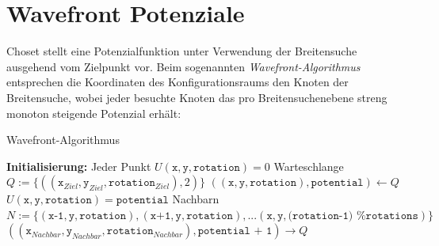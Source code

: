 \vspace*{0.2cm}
\section{Wavefront Potenziale}

Choset stellt eine Potenzialfunktion unter Verwendung der Breitensuche ausgehend vom Zielpunkt vor. Beim sogenannten \textit{Wavefront-Algorithmus} entsprechen die Koordinaten des Konfigurationsraums den Knoten der Breitensuche, wobei jeder besuchte Knoten das pro Breitensuchenebene streng monoton steigende Potenzial erhält: \cite{choset.2007}
\vspace*{0.1cm}
\begin{algorithm}
\caption{Wavefront-Algorithmus}
	\begin{algorithmic}[1]
  \State \textbf{Initialisierung:}
  \State \hspace{\algorithmicindent} Jeder Punkt $U(\texttt{x}, \texttt{y}, \texttt{rotation}) = 0$
  \State \hspace{\algorithmicindent} Warteschlange $Q := \{((\texttt{x}_{Ziel}, \texttt{y}_{Ziel}, \texttt{rotation}_{Ziel}), 2)\}$
		\vspace*{0.3cm}
      \State $((\texttt{x}, \texttt{y}, \texttt{rotation}), \texttt{potential}) \gets Q$
      \State $U(\texttt{x}, \texttt{y}, \texttt{rotation}) = \texttt{potential}$
      \State Nachbarn $N := \{(\texttt{x-1}, \texttt{y}, \texttt{rotation}), (\texttt{x+1}, \texttt{y}, \texttt{rotation}), ... (\texttt{x}, \texttt{y}, \texttt{(rotation-1) \% rotations})\}$
              \State $((\texttt{x}_{Nachbar}, \texttt{y}_{Nachbar}, \texttt{rotation}_{Nachbar}), \texttt{potential + 1}) \rightarrow Q$
          \EndIf
      \EndFor
  \EndWhile
	\end{algorithmic}
\end{algorithm}


